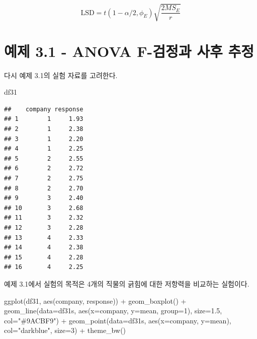 \documentclass[
]{book}
\newenvironment{Shaded}{\begin{snugshade}}{\end{snugshade}}
\newcommand{\AttributeTok}[1]{\textcolor[rgb]{0.77,0.63,0.00}{#1}}
\newcommand{\DecValTok}[1]{\textcolor[rgb]{0.00,0.00,0.81}{#1}}
\newcommand{\FloatTok}[1]{\textcolor[rgb]{0.00,0.00,0.81}{#1}}
\newcommand{\FunctionTok}[1]{\textcolor[rgb]{0.00,0.00,0.00}{#1}}
\newcommand{\NormalTok}[1]{#1}
\newcommand{\SpecialCharTok}[1]{\textcolor[rgb]{0.00,0.00,0.00}{#1}}
\newcommand{\StringTok}[1]{\textcolor[rgb]{0.31,0.60,0.02}{#1}}
\begin{document}
\[  \text{LSD} =t(1-\alpha/2, \phi_E) \sqrt{ \frac{2MS_E}{r}}  \]

\hypertarget{uxc608uxc81c-3.1---anova-f-uxac80uxc815uxacfc-uxc0acuxd6c4-uxcd94uxc815}{%
\section{예제 3.1 - ANOVA F-검정과 사후 추정}\label{uxc608uxc81c-3.1---anova-f-uxac80uxc815uxacfc-uxc0acuxd6c4-uxcd94uxc815}}

다시 예제 3.1의 실험 자료를 고려한다.

\begin{Shaded}
\begin{Highlighting}[]
\NormalTok{df31}
\end{Highlighting}
\end{Shaded}

\begin{verbatim}
##    company response
## 1        1     1.93
## 2        1     2.38
## 3        1     2.20
## 4        1     2.25
## 5        2     2.55
## 6        2     2.72
## 7        2     2.75
## 8        2     2.70
## 9        3     2.40
## 10       3     2.68
## 11       3     2.32
## 12       3     2.28
## 13       4     2.33
## 14       4     2.38
## 15       4     2.28
## 16       4     2.25
\end{verbatim}

예제 3.1에서 실험의 목적은 4개의 직물의 긁힘에 대한 저항력을 비교하는 실험이다.

\begin{Shaded}
\begin{Highlighting}[]
\FunctionTok{ggplot}\NormalTok{(df31, }\FunctionTok{aes}\NormalTok{(company, response)) }\SpecialCharTok{+}
  \FunctionTok{geom\_boxplot}\NormalTok{() }\SpecialCharTok{+} 
  \FunctionTok{geom\_line}\NormalTok{(}\AttributeTok{data=}\NormalTok{df31s, }\FunctionTok{aes}\NormalTok{(}\AttributeTok{x=}\NormalTok{company, }\AttributeTok{y=}\NormalTok{mean, }\AttributeTok{group=}\DecValTok{1}\NormalTok{), }\AttributeTok{size=}\FloatTok{1.5}\NormalTok{, }\AttributeTok{col=}\StringTok{"\#9ACBF9"}\NormalTok{) }\SpecialCharTok{+}
  \FunctionTok{geom\_point}\NormalTok{(}\AttributeTok{data=}\NormalTok{df31s, }\FunctionTok{aes}\NormalTok{(}\AttributeTok{x=}\NormalTok{company, }\AttributeTok{y=}\NormalTok{mean), }\AttributeTok{col=}\StringTok{"darkblue"}\NormalTok{, }\AttributeTok{size=}\DecValTok{3}\NormalTok{) }\SpecialCharTok{+}
  \FunctionTok{theme\_bw}\NormalTok{()}
\end{Highlighting}
\end{Shaded}
\end{document}

